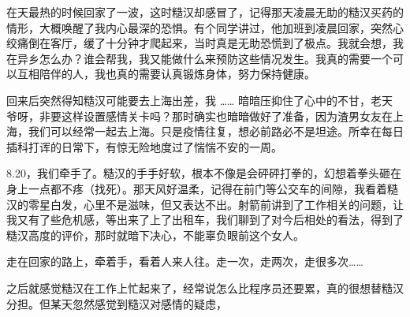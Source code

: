 \documentclass[a4paper, zihao=-4,utf8]{ctexart}
\begin{document}
在天最热的时候回家了一波，这时糙汉却感冒了，记得那天凌晨无助的糙汉买药的情形，大概唤醒了我内心最深的恐惧。有个同学讲过，他加班到凌晨回家，突然心绞痛倒在客厅，缓了十分钟才爬起来，当时真是无助恐慌到了极点。我就会想，我在异乡怎么办？谁会帮我，我又能做什么来预防这些情况发生。我真的需要一个可以互相陪伴的人，我也真的需要认真锻炼身体，努力保持健康。

回来后突然得知糙汉可能要去上海出差，我 …… 暗暗压抑住了心中的不甘，老天爷呀，非要这样设置感情关卡吗？那时确实也暗暗做好了准备，因为渣男女友在上海，我们可以经常一起去上海。只是疫情往复，想必前路必不是坦途。所幸在每日插科打诨的日常下，有惊无险地度过了惴惴不安的一周。

8.20，我们牵手了。糙汉的手手好软，根本不像是会砰砰打拳的，幻想着拳头砸在身上一点都不疼（找死）。那天风好温柔，记得在前门等公交车的间隙，我看着糙汉的零星白发，心里不是滋味，但又表达不出。射箭前讲到了工作相关的问题，让我又有了些危机感，等出来了上了出租车，我们聊到了对今后相处的看法，得到了糙汉高度的评价，那时就暗下决心，不能辜负眼前这个女人。

走在回家的路上，牵着手，看着人来人往。走一次，走两次，走很多次……

之后就感觉糙汉在工作上忙起来了，经常说怎么比程序员还要累，真的很想替糙汉分担。但某天忽然感觉到糙汉对感情的疑虑，

\begin{figure}[htp]
  \centering
\end{figure}
\end{document}
